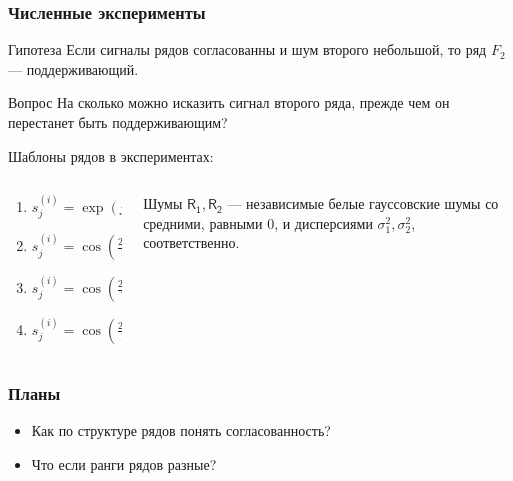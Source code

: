 \documentclass{beamer}
\begin{document}

        

        


    \begin{frame}
        \frametitle{Численные эксперименты}
        
        \begin{block}{Гипотеза}
            Если сигналы рядов согласованны и шум второго небольшой, то ряд $F_2$ --- поддерживающий. 
        \end{block}

        \begin{block}{Вопрос}
            На сколько можно исказить сигнал второго ряда, прежде чем он перестанет быть поддерживающим?
        \end{block}

        Шаблоны рядов в экспериментах:
        \begin{columns}
            \begin{column}{0.5\textwidth}
                \begin{enumerate}
                    \item $s^{(i)}_j = \exp(j\lambda_i)$
                    \item $s^{(i)}_j = \cos(\frac{2\pi j}{12})\exp(j\lambda_i)$
                    \item $s^{(i)}_j = \cos(\frac{2\pi j}{T_i})$
                    \item $s^{(i)}_j = \cos(\frac{2\pi j}{12}) + \exp(j\lambda_i)$
                \end{enumerate}
            \end{column}
            \begin{column}{0.5\textwidth}
                Шумы $\mathsf{R_1, R_2}$ --- независимые белые гауссовские шумы со средними, равными 0, и дисперсиями $\sigma_1^2, \sigma_2^2$, соответственно.
            \end{column}
        \end{columns} 
                
    \end{frame}

    \begin{frame}
        \frametitle{Планы}
        \begin{itemize}
            \item Как по структуре рядов понять согласованность?
            \item Что если ранги рядов разные?
        \end{itemize}
    \end{frame}
\end{document}
